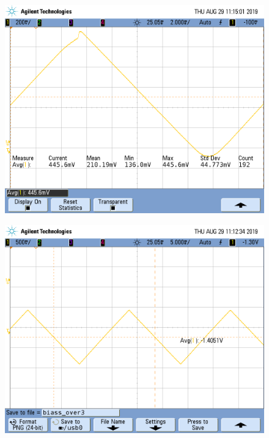 \documentclass[a4paper]{article}
\begin{document}
\begin{figure}[H]
\centering
\begin{minipage}{.5\textwidth}
  \centering
  \includegraphics[width=.99\linewidth]{imagenes/RS2CORTOLF356capa.png}
  \label{fig:ib+}
\end{minipage}%
\begin{minipage}{.5\textwidth}
  \centering
  \includegraphics[width=.99\linewidth]{imagenes/RS1CORTOLF356capa.png}
  \label{fig:ib-}
\end{minipage}
\end{figure}
\end{document}
